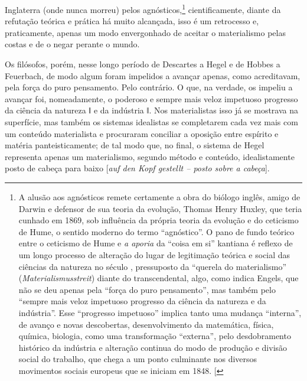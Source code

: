 Inglaterra (onde nunca morreu) pelos agnósticos,\footnote{A
  alusão aos agnósticos remete certamente a obra do biólogo inglês,
  amigo de Darwin e defensor de sua teoria da evolução, Thomas Henry
  Huxley, que teria cunhado em 1869, sob influência da própria teoria da
  evolução e do ceticismo de Hume, o sentido moderno do termo
  ``agnóstico''. O pano de fundo teórico entre o ceticismo de Hume e
  \emph{a aporia} da ``coisa em si'' kantiana é reflexo de um longo
  processo de alteração do lugar de legitimação teórica e social das
  ciências da natureza no século , pressuposto da ``querela do
  materialismo'' (\emph{Materialismusstreit}) diante do transcendental,
  algo, como indica Engels, que não se deu apenas pela ``força do puro
  pensamento'', mas também pelo ``sempre mais veloz impetuoso progresso
  da ciência da natureza e da indústria''. Esse ``progresso impetuoso''
  implica tanto uma mudança ``interna'', de avanço e novas descobertas,
  desenvolvimento da matemática, física, química, biologia, como uma
  transformação ``externa'', pelo desdobramento histórico da indústria e
  alteração continua do modo de produção e divisão social do trabalho,
  que chega a um ponto culminante nos diversos movimentos sociais
  europeus que se iniciam em 1848. {[}\versal{N.\,T.}{]}} cientificamente, diante da
refutação teórica e prática há muito alcançada, isso é um retrocesso e,
praticamente, apenas um modo envergonhado de aceitar o materialismo
pelas costas e de o negar perante o mundo.

Os filósofos, porém, nesse longo período
de Descartes a Hegel e de Hobbes a Feuerbach,
de modo algum foram impelidos a avançar apenas, como acreditavam, pela
força do puro pensamento. Pelo contrário. O que, na verdade, os impeliu
a avançar foi, nomeadamente, o poderoso e sempre mais veloz impetuoso
progresso da ciência da natureza ǁ e da indústria ǁ. Nos materialistas
isso já se mostrava na superfície, mas também os sistemas idealistas se
completarem cada vez mais com um conteúdo materialista e procuraram
conciliar a oposição entre espírito e matéria panteisticamente; de tal
modo que, no final, o sistema de Hegel representa apenas um materialismo, segundo método e conteúdo, idealistamente posto de cabeça para baixo {[}\emph{auf den Kopf gestellt -- posto sobre a cabeça}{]}.

